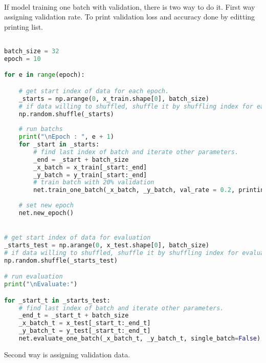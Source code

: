 \documentclass[12pt]{report}
\begin{document}
\paragraph{}
If model training one batch with validation, there is two way to do it. First way assigning validation rate. To print validation loss and accuracy done by editting printing list. 

\begin{lstlisting}[language=Python, numbers=none, caption={Train and evaluate batch with validation rate.}, label={ex:train-batch-val-rate}]

batch_size = 32
epoch = 10

for e in range(epoch):

	# get start index of data for each epoch.
	_starts = np.arange(0, x_train.shape[0], batch_size)
	# if data willing to shuffled, shuffle it by shuffling index for each epoch.
	np.random.shuffle(_starts)
	
	# run batchs 
	print("\nEpoch : ", e + 1)
	for _start in _starts:
		# find last index of batch and iterate other parameters.
		_end = _start + batch_size                
		_x_batch = x_train[_start:_end]
		_y_batch = y_train[_start:_end]
		# train batch with 20% validation
		net.train_one_batch(_x_batch, _y_batch, val_rate = 0.2, printing=['loss', 'accuracy', 'val_loss', 'val_acc'], single_batch=False)
	
	# set new epoch 
	net.new_epoch()


# get start index of data for evaluation
_starts_test = np.arange(0, x_test.shape[0], batch_size)
# if data willing to shuffled, shuffle it by shuffling index for evaluation
np.random.shuffle(_starts_test)

# run evaluation
print("\nEvaluate:")

for _start_t in _starts_test:
	# find last index of batch and iterate other parameters.
	_end_t = _start_t + batch_size                
	_x_batch_t = x_test[_start_t:_end_t]
	_y_batch_t = y_test[_start_t:_end_t]
	net.evaluate_one_batch(_x_batch_t, _y_batch_t, single_batch=False)

\end{lstlisting}

Second way is assigning validation data. 
\end{document}
